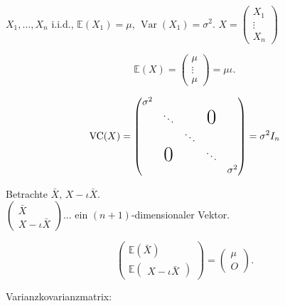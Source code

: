 \documentclass{tstextbook}
\DeclareMathOperator{\VC}{VC} %
\DeclareMathOperator{\Var}{Var}
\begin{document}
\begin{example}
	\label{example.vc}
	
	$ X_1,\ldots,X_n $ i.i.d., $ \mathbb{E}{(X_1)}= \mu $, $ \Var(X_1) = \sigma^2 $.
	$ X = \begin{pmatrix}
		X_1 \\ \vdots \\ X_n
	\end{pmatrix} $ 

\[	\mathbb{E}(X) = \begin{pmatrix}
		\mu \\ \vdots \\ \mu
	\end{pmatrix} = \mu\iota. 
\]

\[ \VC(X) = \begin{pmatrix}
		
			\sigma^2 										\\
			& \ddots  		& 			& \text{\huge0}		\\
			& 				& \ddots               			\\
			& \text{\huge0} & 			& \ddots           	\\
			& 				& 			& 		& \sigma^2
		
	\end{pmatrix} = \sigma^2 I_n
\]

Betrachte $ \bar{X},\, X-\iota\bar{X} $. \\
$ \begin{pmatrix}
	\bar{X} \\ X-\iota\bar{X}
\end{pmatrix}\ldots $ ein $ (n+1) $-dimensionaler Vektor.


\[
\begin{pmatrix}\mathbb{E}\left(\bar{X}\right)\\
	\mathbb{E}\begin{pmatrix}X-\iota\bar{X}\end{pmatrix}
\end{pmatrix}=\begin{pmatrix}\mu\\
	O
\end{pmatrix}.
\]

Varianzkovarianzmatrix:


\end{example}
\end{document}

